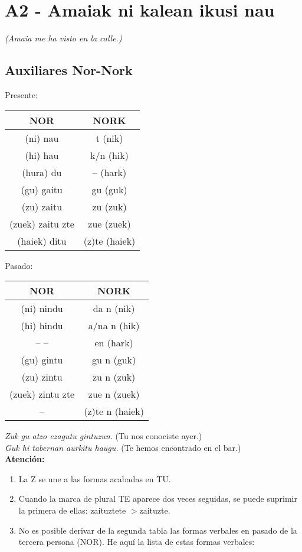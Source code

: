 \documentclass[11pt, a4paper]{article}
\begin{document}
\newpage
\section{A2 - Amaiak ni kalean ikusi nau}
\indent \indent \textit{(Amaia me ha visto en la calle.)}\\

\subsection{Auxiliares Nor-Nork}
\begin{table}[h]
\centering
Presente:
\begin{tabular}{cc}
\hline
NOR & NORK\\
\hline
(ni) nau&t (nik)\\
(hi) hau&k/n (hik)\\
(hura) du&– (hark)\\
(gu) gaitu&gu (guk)\\
(zu) zaitu&zu (zuk)\\
(zuek) zaitu zte&zue (zuek)\\
(haiek) ditu&(z)te (haiek)
\end{tabular}
\end{table}

\begin{table}[h]
\centering
Pasado:
\begin{tabular}{cc}
\hline
NOR & NORK\\
\hline
(ni) nindu&da n (nik)\\
(hi) hindu&a/na n (hik)\\
– –&en (hark)\\
(gu) gintu&gu n (guk)\\
(zu) zintu&zu n (zuk)\\
(zuek) zintu zte&zue n (zuek)\\
–&(z)te n (haiek)
\end{tabular}
\end{table}

\indent \textit{Zuk gu atzo ezagutu gintuzun.} (Tu nos conociste ayer.)\\
\indent \textit{Guk hi tabernan aurkitu haugu.} (Te hemos encontrado en el bar.)\\

\noindent \textbf{Atención:}
\begin{enumerate}
\item La Z se une a las formas acabadas en TU.
\item Cuando la marca de plural TE aparece dos veces seguidas, se puede suprimir la primera de ellas: zaituztete $>$zaituzte.
\item No es posible derivar de la segunda tabla las formas verbales en pasado de la tercera persona (NOR). He aquí la lista de estas formas verbales:
\end{enumerate}
\end{document}
